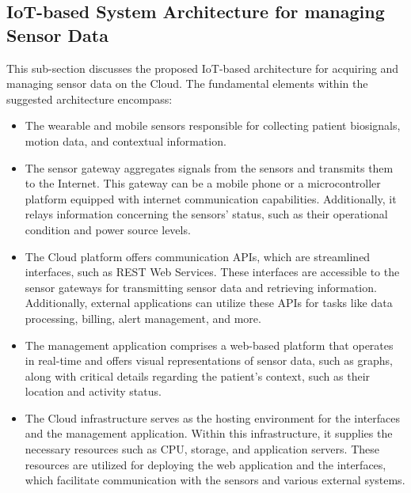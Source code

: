 \documentclass{article}
\begin{document}
\subsection{IoT-based System Architecture for managing Sensor Data} This sub-section discusses the proposed IoT-based architecture for acquiring and managing sensor data on the Cloud.
The fundamental elements within the suggested architecture encompass:
\begin{itemize}
    \item The wearable and mobile sensors responsible for collecting patient biosignals, motion data, and contextual information.
    \item The sensor gateway aggregates signals from the sensors and transmits them to the Internet. This gateway can be a mobile phone or a microcontroller platform equipped with internet communication capabilities. Additionally, it relays information concerning the sensors' status, such as their operational condition and power source levels.
    \item The Cloud platform offers communication APIs, which are streamlined interfaces, such as REST Web Services. These interfaces are accessible to the sensor gateways for transmitting sensor data and retrieving information. Additionally, external applications can utilize these APIs for tasks like data processing, billing, alert management, and more.
    \item The management application comprises a web-based platform that operates in real-time and offers visual representations of sensor data, such as graphs, along with critical details regarding the patient's context, such as their location and activity status.
    \item The Cloud infrastructure serves as the hosting environment for the interfaces and the management application. Within this infrastructure, it supplies the necessary resources such as CPU, storage, and application servers. These resources are utilized for deploying the web application and the interfaces, which facilitate communication with the sensors and various external systems.
\end{itemize}
\end{document}
